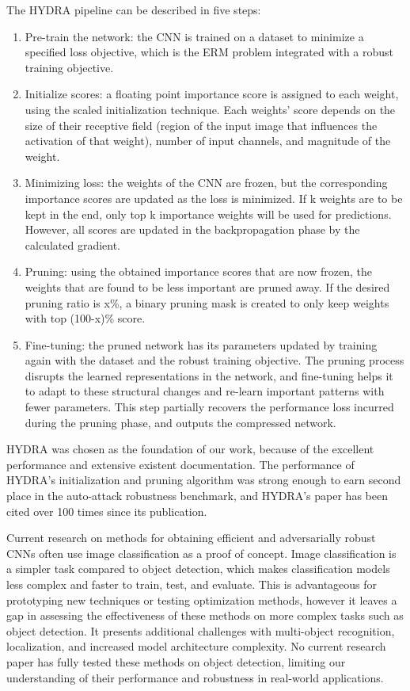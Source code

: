 \documentclass[journal,onecolumn,12pt]{IEEEtran}
\begin{document}
The HYDRA pipeline can be described in five steps:
\begin{enumerate}
    \item Pre-train the network: the CNN is trained on a dataset to minimize a specified loss objective, which is the ERM problem integrated with a robust training objective.
    \item Initialize scores: a floating point importance score is assigned to each weight, using the scaled initialization technique. Each weights' score depends on the size of their receptive field (region of the input image that influences the activation of that weight), number of input channels, and magnitude of the weight.
    \item Minimizing loss: the weights of the CNN are frozen, but the corresponding importance scores are updated as the loss is minimized. If k weights are to be kept in the end, only top k importance weights will be used for predictions. However, all scores are updated in the backpropagation phase by the calculated gradient.
    \item Pruning: using the obtained importance scores that are now frozen, the weights that are found to be less important are pruned away. If the desired pruning ratio is x\%, a binary pruning mask is created to only keep weights with top (100-x)\% score. 
    \item Fine-tuning: the pruned network has its parameters updated by training again with the dataset and the robust training objective. The pruning process disrupts the learned representations in the network, and fine-tuning helps it to adapt to these structural changes and re-learn important patterns with fewer parameters. This step partially recovers the performance loss incurred during the pruning phase, and outputs the compressed network. 
\end{enumerate}

HYDRA was chosen as the foundation of our work, because of the excellent performance and extensive existent documentation. The performance of HYDRA's initialization and pruning algorithm was strong enough to earn second place in the auto-attack robustness benchmark, and HYDRA's paper has been cited over 100 times since its publication.

Current research on methods for obtaining efficient and adversarially robust CNNs often use image classification as a proof of concept. Image classification is a simpler task compared to object detection, which makes classification models less complex and faster to train, test, and evaluate. This is advantageous for prototyping new techniques or testing optimization methods, however it leaves a gap in assessing the effectiveness of these methods on more complex tasks such as object detection. It presents additional challenges with multi-object recognition, localization, and increased model architecture complexity. No current research paper has fully tested these methods on object detection, limiting our understanding of their performance and robustness in real-world applications.
\end{document}
